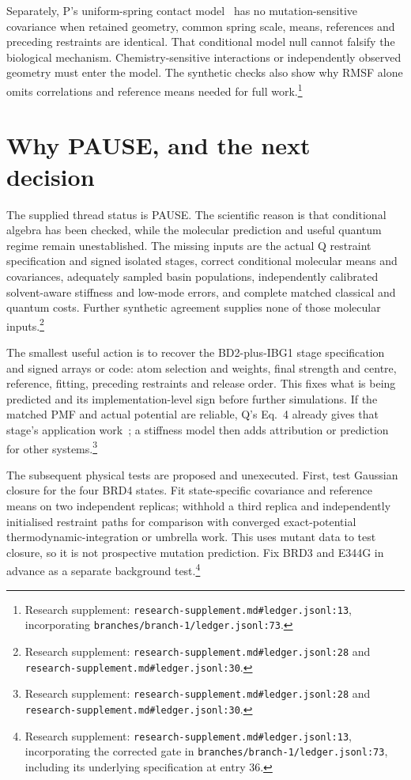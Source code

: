 \documentclass{article}
\begin{document}
Separately, P's uniform-spring contact model~\cite{P} has no mutation-sensitive covariance when retained geometry, common spring scale, means, references and preceding restraints are identical. That conditional model null cannot falsify the biological mechanism. Chemistry-sensitive interactions or independently observed geometry must enter the model. The synthetic checks also show why RMSF alone omits correlations and reference means needed for full work.\footnote{Research supplement: \nolinkurl{research-supplement.md#ledger.jsonl:13}, incorporating \nolinkurl{branches/branch-1/ledger.jsonl:73}.}

\section{Why PAUSE, and the next decision}

The supplied thread status is PAUSE. The scientific reason is that conditional algebra has been checked, while the molecular prediction and useful quantum regime remain unestablished. The missing inputs are the actual Q restraint specification and signed isolated stages, correct conditional molecular means and covariances, adequately sampled basin populations, independently calibrated solvent-aware stiffness and low-mode errors, and complete matched classical and quantum costs. Further synthetic agreement supplies none of those molecular inputs.\footnote{Research supplement: \nolinkurl{research-supplement.md#ledger.jsonl:28} and \nolinkurl{research-supplement.md#ledger.jsonl:30}.}

The smallest useful action is to recover the BD2-plus-IBG1 stage specification and signed arrays or code: atom selection and weights, final strength and centre, reference, fitting, preceding restraints and release order. This fixes what is being predicted and its implementation-level sign before further simulations. If the matched PMF and actual potential are reliable, Q's Eq.~4 already gives that stage's application work~\cite{Q}; a stiffness model then adds attribution or prediction for other systems.\footnote{Research supplement: \nolinkurl{research-supplement.md#ledger.jsonl:28} and \nolinkurl{research-supplement.md#ledger.jsonl:30}.}

The subsequent physical tests are proposed and unexecuted. First, test Gaussian closure for the four BRD4 states. Fit state-specific covariance and reference means on two independent replicas; withhold a third replica and independently initialised restraint paths for comparison with converged exact-potential thermodynamic-integration or umbrella work. This uses mutant data to test closure, so it is not prospective mutation prediction. Fix BRD3 and E344G in advance as a separate background test.\footnote{Research supplement: \nolinkurl{research-supplement.md#ledger.jsonl:13}, incorporating the corrected gate in \nolinkurl{branches/branch-1/ledger.jsonl:73}, including its underlying specification at entry 36.}
\end{document}
